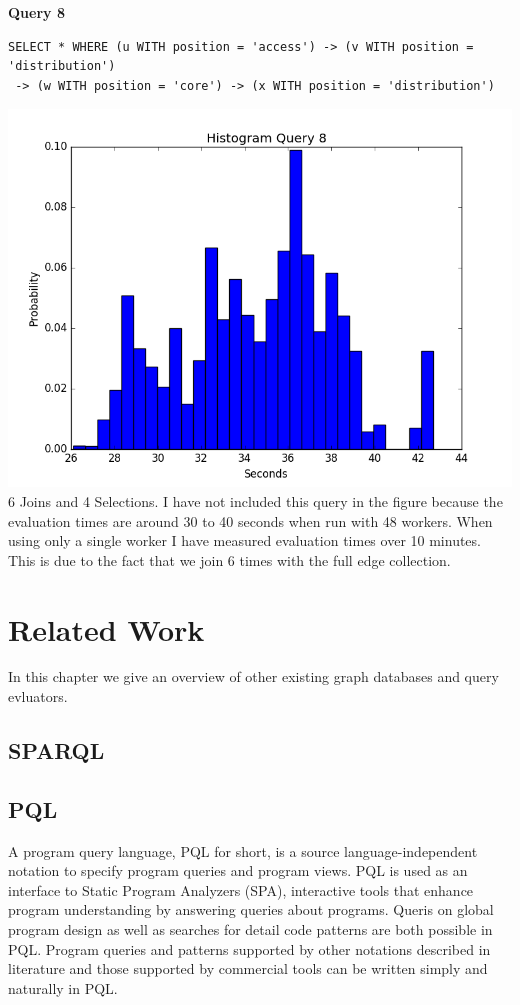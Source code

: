 \documentclass[11pt,singlecolumn]{scrartcl}
\begin{document}
\clearpage
\textbf{Query 8}\\
\begin{verbatim}
SELECT * WHERE (u WITH position = 'access') -> (v WITH position = 'distribution')
 -> (w WITH position = 'core') -> (x WITH position = 'distribution')\end{verbatim}
\includegraphics[width=1\textwidth]{q81}
6 Joins and 4 Selections. I have not included this query in the figure because the evaluation times are around 30 to 40 seconds when run with 48 workers. When using only a single worker I have measured evaluation times over 10 minutes. This is due to the fact that we join 6 times with the full edge collection.
\clearpage

\section{Related Work}
In this chapter we give an overview of other existing graph databases and query evluators.

\subsection{SPARQL}

\subsection{PQL}
A program query language, PQL for short, is a source language-independent notation to specify program queries and program views. PQL is used as an interface to Static Program Analyzers (SPA), interactive tools that enhance program understanding by answering queries about programs. Queris on global program design as well as searches for detail code patterns are both possible in PQL. Program queries and patterns supported by other notations described in literature and those supported by commercial tools can be written simply and naturally in PQL.\cite {PQL}
\end{document}
